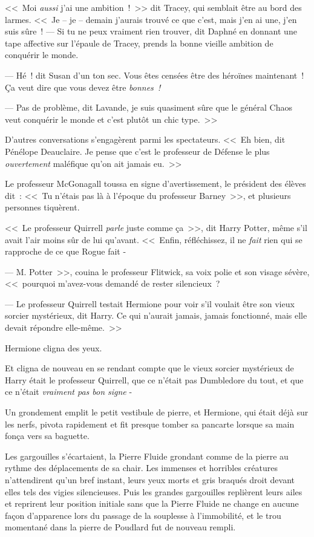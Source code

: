 <<~Moi \emph{aussi} j'ai une ambition~!~>> dit Tracey, qui semblait être au bord des larmes. <<~Je -- je -- demain j'aurais trouvé ce que c'est, mais j'en ai une, j'en suis sûre~!
--- Si tu ne peux vraiment rien trouver, dit Daphné en donnant une tape affective sur l'épaule de Tracey, prends la bonne vieille ambition de conquérir le monde.

--- Hé~! dit Susan d'un ton sec. Vous êtes censées être des héroïnes maintenant~! Ça veut dire que vous devez être \emph{bonnes~!}

--- Pas de problème, dit Lavande, je suis quasiment sûre que le général Chaos veut conquérir le monde et c'est plutôt un chic type.~>>

D'autres conversations s'engagèrent parmi les spectateurs. <<~Eh bien, dit Pénélope Deauclaire. Je pense que c'est le professeur de Défense le plus \emph{ouvertement} maléfique qu'on ait jamais eu.~>>

Le professeur McGonagall toussa en signe d'avertissement, le président des élèves dit~: <<~Tu n'étais pas là à l'époque du professeur Barney~>>, et plusieurs personnes tiquèrent.

<<~Le professeur Quirrell \emph{parle} juste comme ça~>>, dit Harry Potter, même s'il avait l'air moins sûr de lui qu'avant. <<~Enfin, réfléchissez, il ne \emph{fait} rien qui se rapproche de ce que Rogue fait -

--- M. Potter~>>, couina le professeur Flitwick, sa voix polie et son visage sévère, <<~pourquoi m'avez-vous demandé de rester silencieux~?

--- Le professeur Quirrell testait Hermione pour voir s'il voulait être son vieux sorcier mystérieux, dit Harry. Ce qui n'aurait jamais, jamais fonctionné, mais elle devait répondre elle-même.~>>

Hermione cligna des yeux.

Et cligna de nouveau en se rendant compte que le vieux sorcier mystérieux de Harry était le professeur Quirrell, que ce n'était pas Dumbledore du tout, et que ce n'était \emph{vraiment pas bon signe} -

Un grondement emplit le petit vestibule de pierre, et Hermione, qui était déjà sur les nerfs, pivota rapidement et fit presque tomber sa pancarte lorsque sa main fonça vers sa baguette.

Les gargouilles s'écartaient, la Pierre Fluide grondant comme de la pierre au rythme des déplacements de sa chair. Les immenses et horribles créatures n'attendirent qu'un bref instant, leurs yeux morts et gris braqués droit devant elles tels des vigies silencieuses. Puis les grandes gargouilles replièrent leurs ailes et reprirent leur position initiale sans que la Pierre Fluide ne change en aucune façon d'apparence lors du passage de la souplesse à l'immobilité, et le trou momentané dans la pierre de Poudlard fut de nouveau rempli.

